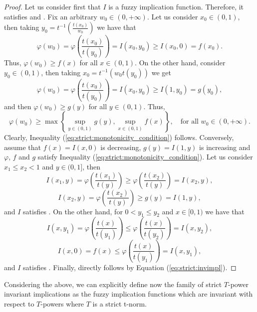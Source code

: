 \begin{proof} Let us consider first that $I$ is a fuzzy implication function. Therefore, it satisfies \Ione and \Itwo. Fix an arbitrary $w_0 \in (0,+\infty)$. Let us consider $x_0 \in (0,1)$, then taking $y_0=t^{-1}\left(\frac{t(x_0)}{w_0}\right)$ we have that
	$$\varphi(w_0)=\varphi \left(\frac{t(x_0)}{t(y_0)}\right)=I(x_0,y_0) \geq I(x_0,0) =f(x_0).$$
	Thus, $\varphi(w_0) \geq f(x)$ for all $x \in (0,1)$. On the other hand, consider $y_0 \in (0,1)$, then taking $x_0=t^{-1}(w_0t(y_0))$ we get
	$$\varphi(w_0)=\varphi \left(\frac{t(x_0)}{t(y_0)}\right)=I(x_0,y_0) \geq I(1,y_0) =g(y_0),$$
	and then $\varphi(w_0) \geq g(y)$ for all $y\in(0,1)$. Thus,
	$$\varphi(w_0) \geq \max \left\lbrace \sup_{y \in (0,1)} g(y), \sup_{x \in (0,1)} f(x) \right\rbrace, \quad \text{for all } w_0 \in (0,+\infty).$$
	Clearly, Inequality (\ref{eq:strict:monotonicity_condition})  follows. Conversely, assume that $f(x)=I(x,0)$ is decreasing, $g(y)=I(1,y)$ is increasing  and  $\varphi$, $f$ and $g$ satisfy Inequality (\ref{eq:strict:monotonicity_condition}). Let us consider $x_1 \leq x_2 <1$ and $y \in (0,1]$, then
	$$I(x_1,y)=\varphi\left(\frac{t(x_1)}{t(y)}\right)\geq \varphi\left(\frac{t(x_2)}{t(y)}\right)=I(x_2,y),$$
	$$I(x_2,y)= \varphi \left(\frac{t(x_2)}{t(y)}\right) \geq g(y)=I(1,y),$$
	and $I$ satisfies \Ione. On the other hand, for $0<y_1 \leq y_2$ and $x \in [0,1)$ we have that
	$$I(x,y_1)=\varphi\left(\frac{t(x)}{t(y_1)}\right)\leq \varphi\left(\frac{t(x)}{t(y_2)}\right)=I(x,y_2),$$
	$$ I(x,0) = f(x) \leq \varphi \left(\frac{t(x)}{t(y_1)}\right)=I(x,y_1),$$
	and $I$ satisfies \Itwo. Finally, \Ithree directly follows by Equation (\ref{eq:strict:invimpl}).
\end{proof}
Considering the above, we can explicitly define now the family of strict $T$-power invariant implications as the fuzzy implication functions which are invariant with respect to $T$-powers where $T$ is a strict t-norm.
